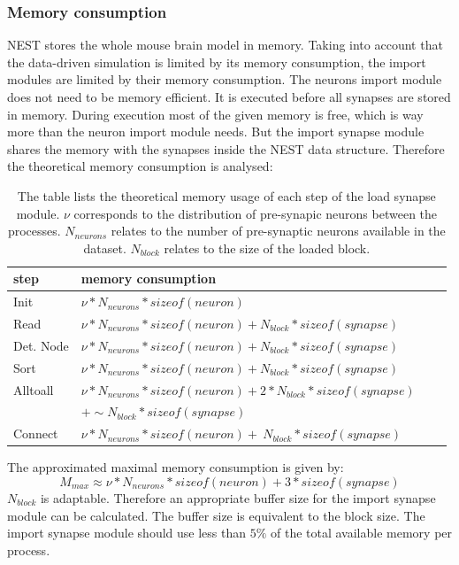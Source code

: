 \subsubsection{Memory consumption}
NEST stores the whole mouse brain model in memory.
Taking into account that the data-driven simulation is limited by its memory consumption, the import modules are limited by their memory consumption.
The neurons import module does not need to be memory efficient.
It is executed before all synapses are stored in memory.
During execution most of the given memory is free, which is way more than the neuron import module needs.
But the import synapse module shares the memory with the synapses inside the NEST data structure. 
Therefore the theoretical memory consumption is analysed:
\begin{table}[ht!]
\begin{tabular}{| l | l | l | l |}
    \hline
    step & memory consumption \\ \hline \hline
    Init & $\nu * N_{neurons} * sizeof(neuron)$ \\ \hline
    Read & $\nu * N_{neurons} * sizeof(neuron) + N_{block} * sizeof(synapse)$ \\ \hline
    Det. Node & $\nu * N_{neurons} * sizeof(neuron) + N_{block} * sizeof(synapse)$ \\ \hline
    Sort & $\nu * N_{neurons} * sizeof(neuron) + N_{block} * sizeof(synapse)$ \\ \hline
    Alltoall & $\nu * N_{neurons} * sizeof(neuron) + 2 * N_{block} * sizeof(synapse)$ \\
    &$ + \sim N_{block} * sizeof(synapse)$ \\ \hline
    Connect & $\nu * N_{neurons} * sizeof(neuron) +  ~N_{block} * sizeof(synapse) $ \\ \hline 
    \end{tabular}
\caption{The table lists the theoretical memory usage of each step of the load synapse module.
$\nu$ corresponds to the distribution of pre-synapic neurons between the processes.
$N_{neurons}$ relates to the number of pre-synaptic neurons available in the dataset.
$N_{block}$ relates to the size of the loaded block.}
\end{table}
The approximated maximal memory consumption is given by:
\begin{equation}
 M_{max} \approx \nu * N_{neurons} * sizeof(neuron) + 3 * sizeof(synapse)
\end{equation}
$N_{block}$ is adaptable.
Therefore an appropriate buffer size for the import synapse module can be calculated.
The buffer size is equivalent to the block size.
The import synapse module should use less than $5\%$ of the total available memory per process.

